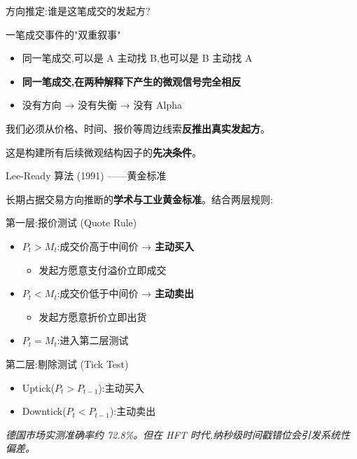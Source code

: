 \documentclass[10pt,aspectratio=169]{beamer}
\begin{document}
\begin{frame}{方向推定:谁是这笔成交的发起方?}

  \begin{exampleblock}{一笔成交事件的"双重叙事"}
    \begin{itemize}
      \item 同一笔成交,可以是 A 主动找 B,也可以是 B 主动找 A
      \item \textbf{同一笔成交,在两种解释下产生的微观信号完全相反}
      \item \alert{没有方向 → 没有失衡 → 没有 Alpha}
    \end{itemize}
  \end{exampleblock}

  \vfill

  我们必须从价格、时间、报价等周边线索\textbf{反推出真实发起方}。

  这是构建所有后续微观结构因子的\textbf{先决条件}。

\end{frame}

\begin{frame}{Lee-Ready 算法 (1991) ——黄金标准\footnotemark}

  长期占据交易方向推断的\textbf{学术与工业黄金标准}。结合两层规则:

  \vfill

  \begin{block}{第一层:报价测试 (Quote Rule)}
    \begin{itemize}
      \item $P_t > M_t$:成交价高于中间价 → \textcolor{quantgreen}{\textbf{主动买入}}
        \begin{itemize}\item[] \scriptsize 发起方愿意支付溢价立即成交\end{itemize}
      \item $P_t < M_t$:成交价低于中间价 → \textcolor{quantred}{\textbf{主动卖出}}
        \begin{itemize}\item[] \scriptsize 发起方愿意折价立即出货\end{itemize}
      \item $P_t = M_t$:进入第二层测试
    \end{itemize}
  \end{block}

  \begin{block}{第二层:剔除测试 (Tick Test)}
    \begin{itemize}
      \item Uptick($P_t > P_{t-1}$):主动买入
      \item Downtick($P_t < P_{t-1}$):主动卖出
    \end{itemize}
  \end{block}

  \vfill

  \centering\small\emph{德国市场实测准确率约 72.8\%。但在 HFT 时代,纳秒级时间戳错位会引发系统性偏差。}

\end{frame}
\end{document}
